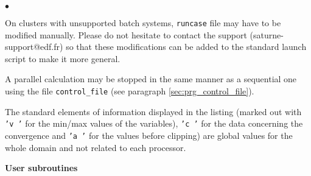 {{{{\begin{list}{$\bullet$}{}
\item On clusters with unsupported batch systems,
      \texttt{runcase} file may have to be modified manually.
      Please do not hesitate to contact the \CS support
      (saturne-support@edf.fr) so that these modifications can be added to
      the standard launch script to make it more general.

\item A parallel calculation may be stopped in the same manner as a
      sequential one using the file \texttt{control\_file} (see paragraph
      \ref{sec:prg_control_file}).

\item The standard elements of information displayed in the listing
      (marked out with \texttt{'v  '} for the min/max values of the
      variables), \texttt{'c  '} for the data concerning the convergence
      and \texttt{'a  '} for the values before clipping) are global
      values for the whole domain and not related to each processor.

\end{list}

\vspace{0.5cm}
{\bf User subroutines}

}}}}
